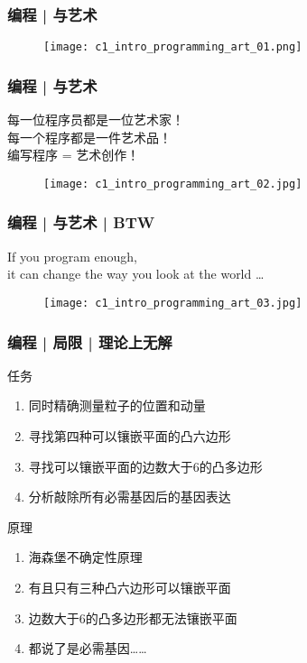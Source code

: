 \begin{frame}
  \frametitle{编程 | 与艺术}
  \begin{figure}
    \centering
    \texttt{[image: c1\_intro\_programming\_art\_01.png]}
  \end{figure}
\end{frame}

\begin{frame}
  \frametitle{编程 | 与艺术}
  \begin{center}
    \large{每一位程序员都是一位艺术家！\\
    每一个程序都是一件艺术品！\\
    编写程序 = 艺术创作！}
\end{center}
\vspace{-1em}
  \begin{figure}
    \centering
    \texttt{[image: c1\_intro\_programming\_art\_02.jpg]}
  \end{figure}
\end{frame}

\begin{frame}
  \frametitle{编程 | 与艺术 | BTW}
  \begin{center}
    \large{If you program enough,\\ it can change the way you look at the world …}
\end{center}
\vspace{-1em}
  \begin{figure}
    \centering
    \texttt{[image: c1\_intro\_programming\_art\_03.jpg]}
  \end{figure}
\end{frame}

\begin{frame}
  \frametitle{编程 | 局限 | 理论上无解}
  \begin{block}{任务}
    \begin{enumerate}
      \item<1-> 同时精确测量粒子的位置和动量
      \item<2-> 寻找第四种可以镶嵌平面的凸六边形
      \item<3-> 寻找可以镶嵌平面的边数大于6的凸多边形
      \item<4-> 分析敲除所有必需基因后的基因表达
    \end{enumerate}
  \end{block}
  \begin{block}{原理}
    \begin{enumerate}
      \item<1-> 海森堡不确定性原理
      \item<2-> 有且只有三种凸六边形可以镶嵌平面
      \item<3-> 边数大于6的凸多边形都无法镶嵌平面
      \item<4-> 都说了是必需基因……
    \end{enumerate}
  \end{block}
\end{frame}

